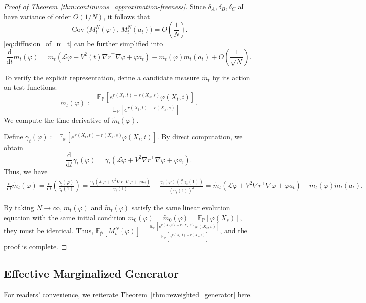 \documentclass{article}
\theoremstyle{plain}
\theoremstyle{definition}
\theoremstyle{remark}
\newcommand{\E}{\mathbb{E}}
\newcommand{\dif}{{\mathrm{d}}}
\renewcommand{\P}{{\mathbb{P}}}
\begin{document}
\begin{proof}[Proof of Theorem~\ref{thm:continuous_approximation-freeness}]
Since \(\delta_A,\delta_B,\delta_C\) all have variance of order \(O(1/N)\), it follows that
\[
\operatorname{Cov}\bigl(M_t^N(\varphi),\,M_t^N(a_t)\bigr)
=O\!\left(\frac{1}{N}\right).
\]
\eqref{eq:diffusion_of_m_t} can be further simplified into
\[
\frac{\dif}{\dif t} m_t(\varphi)
    = m_t\left(\mathcal L\varphi + V^2(t)\nabla r^\top\nabla\varphi + \varphi a_t \right) - m_t(\varphi)m_t(a_t) + O(\frac{1}{\sqrt N}).
\]

To verify the explicit representation, define a candidate measure \(\widetilde{m}_t\) by its action on test functions: \[ \widetilde{m}_t(\varphi) := \frac{\mathbb{E}_{\P}\left[e^{r(X_t,t)-r(X_s,s)}\varphi(X_t,t)\right]}{\mathbb{E}_{\P}\left[e^{r(X_t,t)-r(X_s,s)}\right]}. \] We compute the time derivative of \(\widetilde{m}_t(\varphi)\). 

Define \(\gamma_t(\varphi):=\mathbb{E}_{\P}\left[e^{r(X_t,t)-r(X_s,s)}\varphi(X_t,t)\right]\). By direct computation, we obtain
\[
\frac{\dif}{\dif t}\gamma_t(\varphi) = \gamma_t (\mathcal L \varphi+V^2\nabla r^\top \nabla \varphi + \varphi a_t).
\]
Thus, we have
\begin{align*}
\frac{\dif}{\dif t}\widetilde{m}_t(\varphi) = \frac{\dif}{\dif t} \left(\frac{\gamma_t(\varphi)}{\gamma_t(1)}\right) = \frac{\gamma_t (\mathcal L \varphi+V^2\nabla r^\top \nabla \varphi + \varphi a_t)}{\gamma_t(1)} - \frac{\gamma_t(\varphi)\left(\frac{\dif}{\dif t}\gamma_t(1)\right)}{\left(\gamma_t(1)\right)^2} = \widetilde{m}_t(\mathcal L \varphi+V^2\nabla r^\top \nabla \varphi + \varphi a_t) - \widetilde{m}_t(\varphi)\widetilde{m}_t(a_t).
\end{align*}

By taking \(N\rightarrow \infty\), \(m_t(\varphi)\) and \(\widetilde{m}_t(\varphi)\) satisfy the same linear evolution equation with the same initial condition \(m_0(\varphi)=\widetilde{m}_0(\varphi)=\E_{\P}[\varphi(X_s)]\), they must be identical. Thus, \( \mathbb{E}_{\overline \P}[M_t^N(\varphi)] = \frac{\mathbb{E}_{\P}\left[e^{r(X_t,t)-r(X_s,s)}\varphi(X_t,t)\right]}{\mathbb{E}_{\P}\left[e^{r(X_t,t)-r(X_s,s)}\right]}\), and the proof is complete.
\end{proof}

\subsection{Effective Marginalized Generator}
\label{app:effective_margin}

For readers' convenience, we reiterate Theorem~\ref{thm:reweighted_generator} here.
\end{document}
